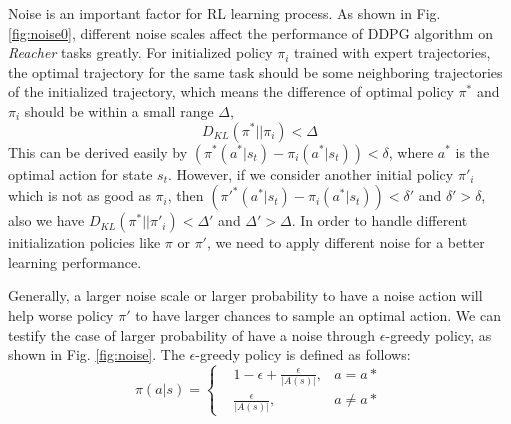 \documentclass{article}
\begin{document}
Noise is an important factor for RL learning process. As shown in Fig. \ref{fig:noise0}, different noise scales affect the performance of DDPG algorithm on \textit{Reacher} tasks greatly. For initialized policy $\pi_i$ trained with expert trajectories, the optimal trajectory for the same task should be some neighboring trajectories of the initialized trajectory, which means the difference of optimal policy $\pi^*$ and $\pi_i$ should be within a small range $\Delta$,
\begin{equation}
	D_{KL}(\pi^*||\pi_i)<\Delta
\end{equation}
This can be derived easily by $(\pi^*(a^*|s_t)- \pi_i(a^*|s_t))<\delta$, where $a^*$ is the optimal action for state $s_t$. However, if we consider another initial policy $\pi'_i$ which is not as good as $\pi_i$, then $(\pi'^*(a^*|s_t)- \pi_i(a^*|s_t))<\delta'$ and $\delta'>\delta$, also we have $D_{KL}(\pi^*||\pi'_i)<\Delta'$ and $\Delta'>\Delta$. In order to handle different initialization policies like $\pi$ or $\pi'$, we need to apply different noise for a better learning performance.

Generally, a larger noise scale or larger probability to have a noise action will help worse policy $\pi'$ to have larger chances to sample an optimal action. We can testify the case of larger probability of have a noise through $\epsilon$-greedy policy, as shown in Fig. \ref{fig:noise}. The $\epsilon$-greedy policy is defined as follows:
\begin{equation}
\pi(a|s)=\left\{
\begin{aligned}
&1-\epsilon+\frac{\epsilon}{|A(s)|}, &a=a* \\
&\frac{\epsilon}{|A(s)|}, &a\neq a*
\end{aligned}
\right.
\end{equation}
\end{document}
